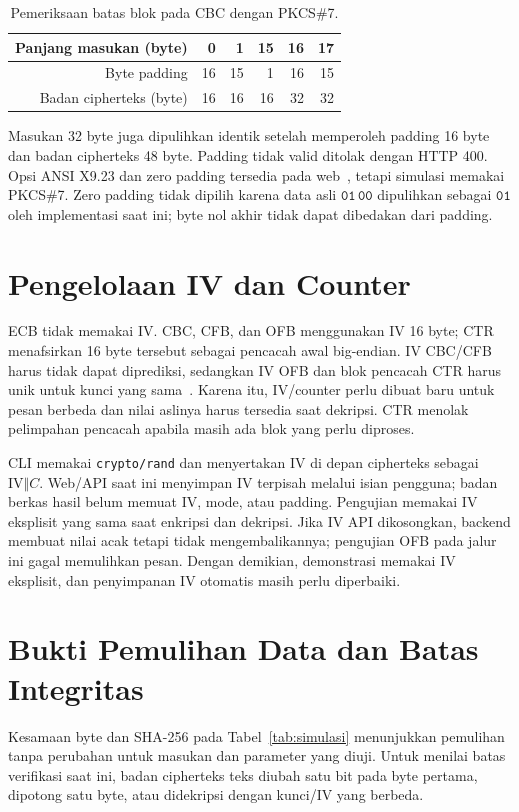 \begin{table}[htbp]
  \centering\small
  \caption{Pemeriksaan batas blok pada CBC dengan PKCS\#7.}
  \begin{tabular}{@{}rrrrrr@{}}
    \toprule Panjang masukan (byte) & 0 & 1 & 15 & 16 & 17\\
    \midrule Byte padding & 16 & 15 & 1 & 16 & 15\\
    Badan cipherteks (byte) & 16 & 16 & 16 & 32 & 32\\
    \bottomrule
  \end{tabular}
\end{table}
Masukan 32 byte juga dipulihkan identik setelah memperoleh padding
16 byte dan badan cipherteks 48 byte. Padding tidak valid ditolak dengan
HTTP 400. Opsi ANSI X9.23 dan zero padding tersedia pada web~\cite{cryptosys}, tetapi
simulasi memakai PKCS\#7. Zero padding tidak dipilih karena data asli
$\mathtt{01\,00}$ dipulihkan sebagai $\mathtt{01}$ oleh implementasi
saat ini; byte nol akhir tidak dapat dibedakan dari padding.

\section{Pengelolaan IV dan Counter}
ECB tidak memakai IV. CBC, CFB, dan OFB menggunakan IV 16 byte; CTR
menafsirkan 16 byte tersebut sebagai pencacah awal big-endian.
IV CBC/CFB harus tidak dapat diprediksi, sedangkan IV OFB dan blok
pencacah CTR harus unik untuk kunci yang sama~\cite{mode}. Karena itu,
IV/counter perlu dibuat baru untuk pesan berbeda dan nilai aslinya
harus tersedia saat dekripsi. CTR menolak pelimpahan pencacah apabila
masih ada blok yang perlu diproses.

CLI memakai \texttt{crypto/rand} dan menyertakan IV di depan cipherteks
sebagai $\mathrm{IV}\Vert C$. Web/API saat ini menyimpan IV terpisah
melalui isian pengguna; badan berkas hasil belum memuat IV, mode, atau
padding. Pengujian memakai IV eksplisit yang sama saat enkripsi dan
dekripsi. Jika IV API dikosongkan, backend membuat nilai acak tetapi tidak
mengembalikannya; pengujian OFB pada jalur ini gagal memulihkan pesan.
Dengan demikian, demonstrasi memakai IV eksplisit, dan penyimpanan IV
otomatis masih perlu diperbaiki.

\section{Bukti Pemulihan Data dan Batas Integritas}
Kesamaan byte dan SHA-256 pada Tabel~\ref{tab:simulasi} menunjukkan
pemulihan tanpa perubahan untuk masukan dan parameter yang diuji. Untuk menilai batas verifikasi saat ini, badan cipherteks
teks diubah satu bit pada byte pertama, dipotong satu byte, atau
didekripsi dengan kunci/IV yang berbeda.

